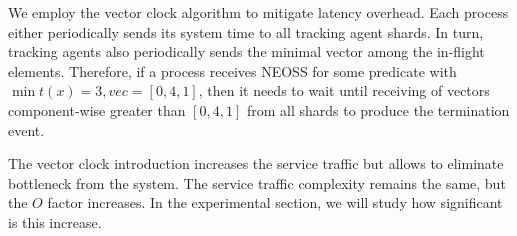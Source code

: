 We employ the vector clock algorithm to mitigate latency overhead. Each process either periodically sends its system time to all tracking agent shards. In turn, tracking agents also periodically sends the minimal vector among the in-flight elements. Therefore, if a process receives NEOSS for some predicate with $\min t(x) = 3, vec=[0,4,1]$, then it needs to wait until receiving of vectors component-wise greater than $[0,4,1]$ from all shards to produce the termination event.

The vector clock introduction increases the service traffic but allows to eliminate bottleneck from the system. The service traffic complexity remains the same, but the $O$ factor increases. In the experimental section, we will study how significant is this increase.
